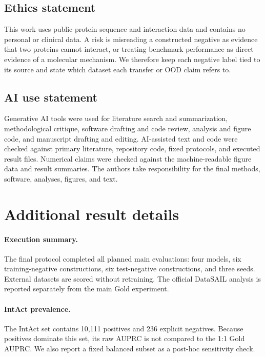 \documentclass{article}
\begin{document}
\subsection*{Ethics statement}

This work uses public protein sequence and interaction data and contains no
personal or clinical data. A risk is misreading a constructed negative as
evidence that two proteins cannot interact, or treating benchmark performance
as direct evidence of a molecular mechanism. We therefore keep each negative
label tied to its source and state which dataset each transfer or OOD claim
refers to.

\subsection*{AI use statement}

Generative AI tools were used for literature search and summarization,
methodological critique, software drafting and code review, analysis and figure
code, and manuscript drafting and editing. AI-assisted text and code were
checked against primary literature, repository code, fixed protocols, and
executed result files. Numerical claims were checked against the machine-readable figure data and
result summaries. The authors take responsibility for the
final methods, software, analyses, figures, and text.




\appendix

\section{Additional result details}

\paragraph{Execution summary.}
The final protocol completed all planned main evaluations: four
models, six training-negative constructions, six test-negative constructions,
and three seeds. External datasets are scored without retraining. The official
DataSAIL analysis is reported separately from the main Gold experiment.

\paragraph{IntAct prevalence.}
The IntAct set contains 10,111 positives and 236 explicit negatives. Because
positives dominate this set, its raw AUPRC is not compared to the 1:1 Gold
AUPRC. We also report a fixed balanced subset as a post-hoc sensitivity check.
\end{document}
